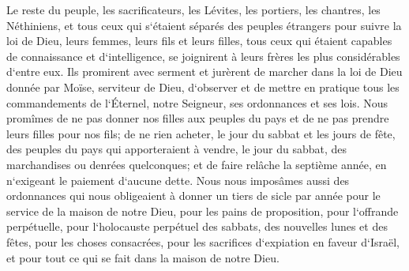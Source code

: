 \verse Le reste du peuple, les sacrificateurs, les Lévites, les portiers, les chantres, les Néthiniens, et tous ceux qui s`étaient séparés des peuples étrangers pour suivre la loi de Dieu, leurs femmes, leurs fils et leurs filles, tous ceux qui étaient capables de connaissance et d`intelligence, 
\verse se joignirent à leurs frères les plus considérables d`entre eux. Ils promirent avec serment et jurèrent de marcher dans la loi de Dieu donnée par Moïse, serviteur de Dieu, d`observer et de mettre en pratique tous les commandements de l`Éternel, notre Seigneur, ses ordonnances et ses lois. 
\verse Nous promîmes de ne pas donner nos filles aux peuples du pays et de ne pas prendre leurs filles pour nos fils; 
\verse de ne rien acheter, le jour du sabbat et les jours de fête, des peuples du pays qui apporteraient à vendre, le jour du sabbat, des marchandises ou denrées quelconques; et de faire relâche la septième année, en n`exigeant le paiement d`aucune dette. 
\verse Nous nous imposâmes aussi des ordonnances qui nous obligeaient à donner un tiers de sicle par année pour le service de la maison de notre Dieu, 
\verse pour les pains de proposition, pour l`offrande perpétuelle, pour l`holocauste perpétuel des sabbats, des nouvelles lunes et des fêtes, pour les choses consacrées, pour les sacrifices d`expiation en faveur d`Israël, et pour tout ce qui se fait dans la maison de notre Dieu. 
